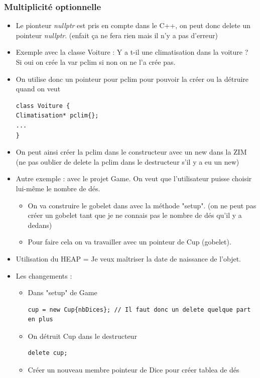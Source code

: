 \documentclass[12pt,a4paper]{article}
\begin{document}
\subsubsection{Multiplicité optionnelle}
\begin{itemize}
\item Le pionteur \textit{nullptr} est pris en compte dans le C++, on peut donc delete un pointeur \textit{nullptr}. (enfait ça ne fera rien mais il n'y a pas d'erreur)
\item Exemple avec la classe Voiture : Y a t-il une climatisation dans la voiture ?\\
Si oui on crée la var pclim si non on ne l'a crée pas.
\item On utilise donc un pointeur pour pclim pour pouvoir la créer ou la détruire quand on veut
\begin{lstlisting}
class Voiture {
Climatisation* pclim{};
...
}
\end{lstlisting}
\item On peut ainsi créer la pclim dans le constructeur avec un new dans la ZIM (ne pas oublier de delete la pclim dans le destructeur s'il y a eu un new)
\item Autre exemple : avec le projet Game. On veut que l'utilisateur puisse choisir lui-même le nombre de dés.
\begin{itemize}
\item On va construire le gobelet dans avec la méthode "setup". (on ne peut pas créer un gobelet tant que je ne connais pas le nombre de dés qu'il y a dedans)
\item Pour faire cela on va travailler avec un pointeur de Cup (gobelet).
\end{itemize}
\item Utilisation du HEAP = Je veux maîtriser la date de naissance de l'objet.
\item Les changements :
\begin{itemize}
\item Dans "setup" de Game
\begin{lstlisting}
cup = new Cup{nbDices}; // Il faut donc un delete quelque part en plus
\end{lstlisting}
\item On détruit Cup dans le destructeur
\begin{lstlisting}
delete cup;
\end{lstlisting}
\item Créer un nouveau membre pointeur de Dice pour créer tablea de dés
\begin{lstlisting}

\end{lstlisting}
\end{itemize}
\end{itemize}
\end{document}
